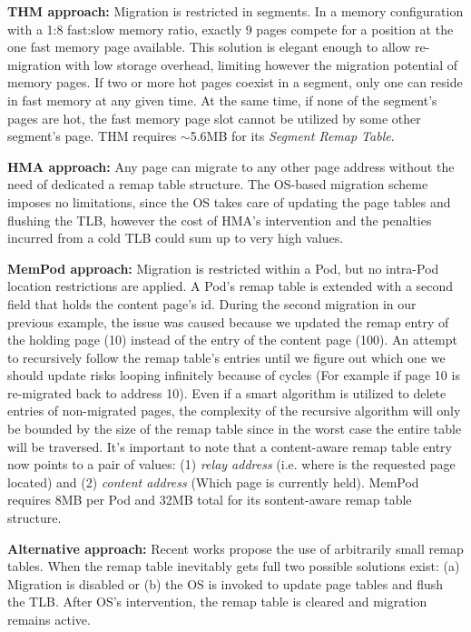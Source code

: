 	\textbf{THM approach:} Migration is restricted in segments. In a memory configuration with a 1:8 fast:slow memory ratio, exactly 9 pages compete for a position at the one fast memory page available. This solution is elegant enough to allow re-migration with low storage overhead, limiting however the migration potential of memory pages. If two or more hot pages coexist in a segment, only one can reside in fast memory at any given time. At the same time, if none of the segment's pages are hot, the fast memory page slot cannot be utilized by some other segment's page. THM requires $\sim$5.6MB for its \textit{Segment Remap Table}.

	\textbf{HMA approach:} Any page can migrate to any other page address without the need of dedicated a remap table structure. The OS-based migration scheme imposes no limitations, since the OS takes care of updating the page tables and flushing the TLB, however the cost of HMA's intervention and the penalties incurred from a cold TLB could sum up to very high values.

	\textbf{MemPod approach:} Migration is restricted within a Pod, but no intra-Pod location restrictions are applied. A Pod's remap table is extended with a second field that holds the content page's id. During the second migration in our previous example, the issue was caused because we updated the remap entry of the holding page (10) instead of the entry of the content page (100). An attempt to recursively follow the remap table's entries until we figure out which one we should update risks looping infinitely because of cycles (For example if page 10 is re-migrated back to address 10). Even if a smart algorithm is utilized to delete entries of non-migrated pages, the complexity of the recursive algorithm will only be bounded by the size of the remap table since in the worst case the entire table will be traversed. It's important to note that a content-aware remap table entry now points to a pair of values: (1) \textit{relay address} (i.e. where is the requested page located) and (2) \textit{content address} (Which page is currently held). MemPod requires 8MB per Pod and 32MB total for its sontent-aware remap table structure.

	\textbf{Alternative approach:} Recent works \cite{TODO} propose the use of arbitrarily small remap tables. When the remap table inevitably gets full two possible solutions exist: (a) Migration is disabled or (b) the OS is invoked to update page tables and flush the TLB. After OS's intervention, the remap table is cleared and migration remains active.

